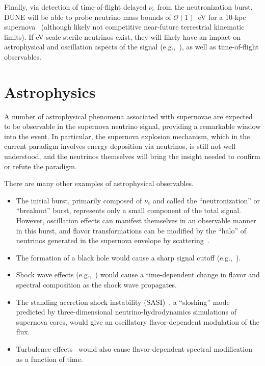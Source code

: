 Finally, via detection of time-of-flight delayed $\nu_e$ from the  neutronization burst,  DUNE will be able to probe neutrino mass bounds of $\mathcal{O}(1)$~eV for a 10-kpc supernova~\cite{Rossi-Torres:2015rla} (although likely not competitive near-future terrestrial kinematic limits).  If eV-scale sterile neutrinos exist, they will likely have an impact on astrophysical and oscillation aspects of the signal (e.g.,~\cite{Keranen:2007ga,Tamborra:2011is,Esmaili:2014gya}), as well as time-of-flight observables. \\


\section{Astrophysics}
\label{sec:physics-snblowe-astrophysics}


A number of astrophysical phenomena associated with supernovae are expected to be observable
in the supernova neutrino signal, providing a remarkable window into the event.  In particular, the supernova explosion mechanism, which in the current paradigm involves energy deposition via neutrinos, is still not well understood, and the neutrinos themselves will bring the insight needed to confirm or refute the paradigm.

There are many other examples of astrophysical observables.
\begin{itemize}
\item The initial burst, primarily composed of $\nu_e$ and called the
  ``neutronization'' or ``breakout''
  burst, %
  represents only a small component of the total signal.  However,
  oscillation effects can manifest themselves in an observable manner
  in this burst, and flavor transformations can be modified by the
  ``halo'' of neutrinos generated in the supernova envelope by
  scattering~\cite{Cherry:2013mv}.
\item The formation of a black hole would cause a sharp signal cutoff
  (e.g.,~\cite{Beacom:2000qy,Fischer:2008rh}).
\item Shock wave effects (e.g.,~\cite{Schirato:2002tg}) would cause a
  time-dependent change in flavor and spectral composition as the
  shock wave propagates.
\item The standing accretion shock instability
  (SASI)~\cite{Hanke:2011jf,Hanke:2013ena}, a ``sloshing'' mode
  predicted by three-dimensional neutrino-hydrodynamics simulations of
  supernova cores, would give an oscillatory flavor-dependent
  modulation of the flux.
\item Turbulence effects~\cite{Friedland:2006ta,Lund:2013uta} would
  also cause flavor-dependent spectral modification as a function of
  time.
\end{itemize}

